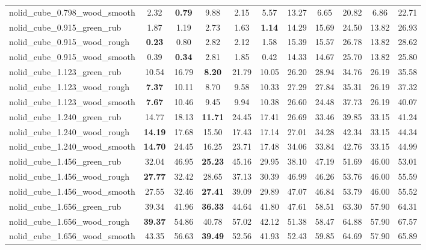 \begin{table}[H]
{\begin{tabular}{l cccccccccc}
        nolid\_cube\_0.798\_wood\_smooth & 2.32 & \textbf{0.79} & 9.88 & 2.15 & 5.57 & 13.27 & 6.65 & 20.82 & 6.86 & 22.71 \\
        nolid\_cube\_0.915\_green\_rub & 1.87 & 1.19 & 2.73 & 1.63 & \textbf{1.14} & 14.29 & 15.69 & 24.50 & 13.82 & 26.93 \\
        nolid\_cube\_0.915\_wood\_rough & \textbf{0.23} & 0.80 & 2.82 & 2.12 & 1.58 & 15.39 & 15.57 & 26.78 & 13.82 & 28.62 \\
        nolid\_cube\_0.915\_wood\_smooth & 0.39 & \textbf{0.34} & 2.81 & 1.85 & 0.42 & 14.33 & 14.67 & 25.70 & 13.82 & 25.80 \\
        nolid\_cube\_1.123\_green\_rub & 10.54 & 16.79 & \textbf{8.20} & 21.79 & 10.05 & 26.20 & 28.94 & 34.76 & 26.19 & 35.58 \\
        nolid\_cube\_1.123\_wood\_rough & \textbf{7.37} & 10.11 & 8.70 & 9.58 & 10.33 & 27.29 & 27.84 & 35.31 & 26.19 & 37.32 \\
        nolid\_cube\_1.123\_wood\_smooth & \textbf{7.67} & 10.46 & 9.45 & 9.94 & 10.38 & 26.60 & 24.48 & 37.73 & 26.19 & 40.07 \\
        nolid\_cube\_1.240\_green\_rub & 14.77 & 18.13 & \textbf{11.71} & 24.45 & 17.41 & 26.69 & 33.46 & 39.85 & 33.15 & 41.24 \\
        nolid\_cube\_1.240\_wood\_rough & \textbf{14.19} & 17.68 & 15.50 & 17.43 & 17.14 & 27.01 & 34.28 & 42.34 & 33.15 & 44.34 \\
        nolid\_cube\_1.240\_wood\_smooth & \textbf{14.70} & 24.45 & 16.25 & 23.71 & 17.48 & 34.06 & 33.84 & 42.76 & 33.15 & 44.99 \\
        nolid\_cube\_1.456\_green\_rub & 32.04 & 46.95 & \textbf{25.23} & 45.16 & 29.95 & 38.10 & 47.19 & 51.69 & 46.00 & 53.01 \\
        nolid\_cube\_1.456\_wood\_rough & \textbf{27.77} & 32.42 & 28.65 & 37.13 & 30.39 & 46.99 & 46.26 & 53.76 & 46.00 & 55.59 \\
        nolid\_cube\_1.456\_wood\_smooth & 27.55 & 32.46 & \textbf{27.41} & 39.09 & 29.89 & 47.07 & 46.84 & 53.79 & 46.00 & 55.52 \\
        nolid\_cube\_1.656\_green\_rub & 39.34 & 41.96 & \textbf{36.33} & 44.64 & 41.80 & 47.61 & 58.51 & 63.30 & 57.90 & 64.31 \\
        nolid\_cube\_1.656\_wood\_rough & \textbf{39.37} & 54.86 & 40.78 & 57.02 & 42.12 & 51.38 & 58.47 & 64.88 & 57.90 & 67.57 \\
        nolid\_cube\_1.656\_wood\_smooth & 43.35 & 56.63 & \textbf{39.49} & 52.56 & 41.93 & 52.43 & 59.85 & 64.69 & 57.90 & 65.89 \\

\end{tabular}}
\end{table}
